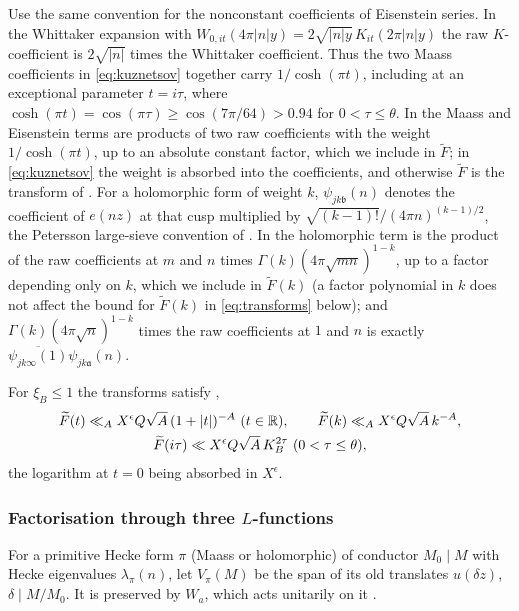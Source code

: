 \documentclass[11pt,colorlinks]{charlie}
\begin{document}
Use the same convention for the nonconstant coefficients of Eisenstein series. In the Whittaker expansion with $W_{0,it}(4\pi|n|y)=2\sqrt{|n|y}\,K_{it}(2\pi|n|y)$ the raw $K$-coefficient is $2\sqrt{|n|}$ times the Whittaker coefficient. Thus the two Maass coefficients in \eqref{eq:kuznetsov} together carry $1/\cosh(\pi t)$, including at an exceptional parameter $t=i\tau$, where $\cosh(\pi t)=\cos(\pi\tau)\ge\cos(7\pi/64)>0.94$ for $0<\tau\le\theta$. In \cite[Theorem~1]{DI} the Maass and Eisenstein terms are products of two raw coefficients with the weight $1/\cosh(\pi t)$, up to an absolute constant factor, which we include in $\widetilde F$; in \eqref{eq:kuznetsov} the weight is absorbed into the coefficients, and otherwise $\widetilde F$ is the transform of \cite{DI}. For a holomorphic form of weight $k$, $\psi_{jk\mathfrak b}(n)$ denotes the coefficient of $e(nz)$ at that cusp multiplied by $\sqrt{(k-1)!}/(4\pi n)^{(k-1)/2}$, the Petersson large-sieve convention of \cite[(1.28)]{DI}. In \cite[Theorem~1]{DI} the holomorphic term is the product of the raw coefficients at $m$ and $n$ times $\Gamma(k)(4\pi\sqrt{mn})^{1-k}$, up to a factor depending only on $k$, which we include in $\widetilde F(k)$ (a factor polynomial in $k$ does not affect the bound for $\widetilde F(k)$ in \eqref{eq:transforms} below); and $\Gamma(k)(4\pi\sqrt{n})^{1-k}$ times the raw coefficients at $1$ and $n$ is exactly $\overline{\psi_{jk\infty}(1)}\psi_{jk\mathfrak a}(n)$.

For $\xi_B\le1$ the transforms satisfy \cite[Lemma~7.1]{DI}, \cite[Lemma~3.4]{Pascadi}
\begin{equation}\label{eq:transforms}
 \begin{gathered}
 \widetilde F(t)\ll_AX^\epsilon Q\sqrt A\,(1+|t|)^{-A}\ (t\in\R),\qquad\widetilde F(k)\ll_AX^\epsilon Q\sqrt A\,k^{-A},\\
 \widetilde F(i\tau)\ll X^\epsilon Q\sqrt A\,K_B^{2\tau}\ (0<\tau\le\theta),
 \end{gathered}
\end{equation}
the logarithm at $t=0$ being absorbed in $X^\epsilon$.

\subsubsection{Factorisation through three $L$-functions}
For a primitive Hecke form $\pi$ (Maass or holomorphic) of conductor $M_0\mid M$ with Hecke eigenvalues $\lambda_\pi(n)$, let $V_\pi(M)$ be the span of its old translates $u(\delta z)$, $\delta\mid M/M_0$. It is preserved by $W_a$, which acts unitarily on it \cite{AtkinLehner}.
\end{document}

